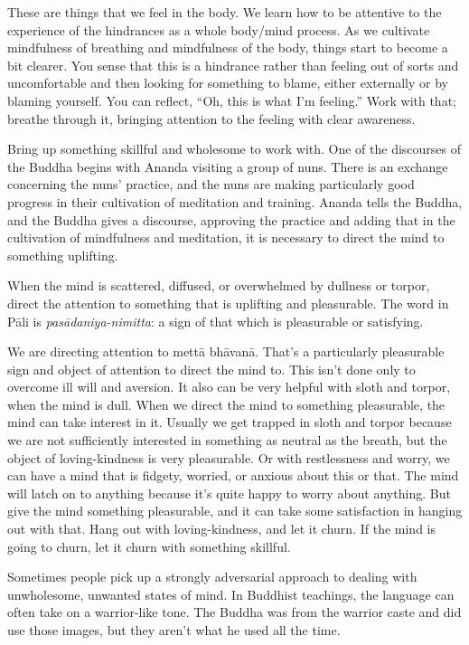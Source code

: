 These are things that we feel in the body. We learn how to be attentive
to the experience of the hindrances as a whole body/mind process. As we
cultivate mindfulness of breathing and mindfulness of the body, things
start to become a bit clearer. You sense that this is a hindrance rather
than feeling out of sorts and uncomfortable and then looking for
something to blame, either externally or by blaming yourself. You can
reflect, “Oh, this is what I’m feeling.” Work with that; breathe through
it, bringing attention to the feeling with clear awareness.

Bring up something skillful and wholesome to work with. One of the
discourses of the Buddha begins with Ananda visiting a group of nuns.
There is an exchange concerning the nuns’ practice, and the nuns are
making particularly good progress in their cultivation of meditation and
training. Ananda tells the Buddha, and the Buddha gives a discourse,
approving the practice and adding that in the cultivation of mindfulness
and meditation, it is necessary to direct the mind to something
uplifting.

When the mind is scattered, diffused, or overwhelmed by dullness or
torpor, direct the attention to something that is uplifting and
pleasurable. The word in Pāli is \emph{pasādaniya-nimitta}: a sign of
that which is pleasurable or satisfying.

We are directing attention to mettā bhāvanā. That’s a particularly
pleasurable sign and object of attention to direct the mind to. This
isn’t done only to overcome ill will and aversion. It also can be very
helpful with sloth and torpor, when the mind is dull. When we direct the
mind to something pleasurable, the mind can take interest in it. Usually
we get trapped in sloth and torpor because we are not sufficiently
interested in something as neutral as the breath, but the object of
loving-kindness is very pleasurable. Or with restlessness and worry, we
can have a mind that is fidgety, worried, or anxious about this or that.
The mind will latch on to anything because it’s quite happy to worry
about anything. But give the mind something pleasurable, and it can take
some satisfaction in hanging out with that. Hang out with
loving-kindness, and let it churn. If the mind is going to churn, let it
churn with something skillful.

Sometimes people pick up a strongly adversarial approach to dealing with
unwholesome, unwanted states of mind. In Buddhist teachings, the
language can often take on a warrior-like tone. The Buddha was from the
warrior caste and did use those images, but they aren’t what he used all
the time.

